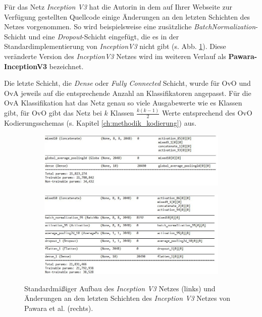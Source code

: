 Für das Netz \textit{Inception V3} hat die Autorin in dem auf Ihrer Webseite zur Verfügung gestellten Quellcode \cite{pawaraWebsiteCode} einige Änderungen an den letzten Schichten des Netzes vorgenommen. So wird beispielsweise eine zusätzliche \textit{BatchNormalization}-Schicht und eine \textit{Dropout}-Schicht eingefügt, die es in der Standardimplementierung von \textit{InceptionV3} nicht gibt (s. Abb. \ref{fig:inceptionAenderungen}). Diese veränderte Version des \textit{InceptionV3} Netzes wird im weiteren Verlauf als \textbf{Pawara-InceptionV3} bezeichnet.

Die letzte Schicht, die \textit{Dense} oder \textit{Fully Connected} Schicht, wurde für OvO und OvA jeweils auf die entsprechende Anzahl an Klassifikatoren angepasst. Für die OvA Klassifikation hat das Netz genau so viele Ausgabewerte wie es Klassen gibt, für OvO gibt das Netz bei $k$ Klassen $\frac{k(k-1)}{2}$ Werte entsprechend des OvO Kodierungsschemas (s. Kapitel \ref{ch:methodik_kodierung}) aus.

\begin{figure}[H]

\begin{minipage}{.5\textwidth}
\begin{figure}[H]
\begin{adjustbox}{width=\textwidth, center}
\includegraphics[scale=1]{img/3_inception-standard.jpg}
\end{adjustbox}
\end{figure}
\end{minipage}%
\begin{minipage}{.5\textwidth}
\begin{figure}[H]
\begin{adjustbox}{width=\textwidth, center}
\includegraphics[scale=1]{img/3_inception-pawara.jpg}
\end{adjustbox}

\end{figure}
\end{minipage}
\caption{Standardmäßiger Aufbau des \textit{Inception V3} Netzes (links) und Änderungen an den letzten Schichten des \textit{Inception V3} Netzes von Pawara et al. \cite{pawaraWebsiteCode} (rechts).}
\label{fig:inceptionAenderungen}
\end{figure}


